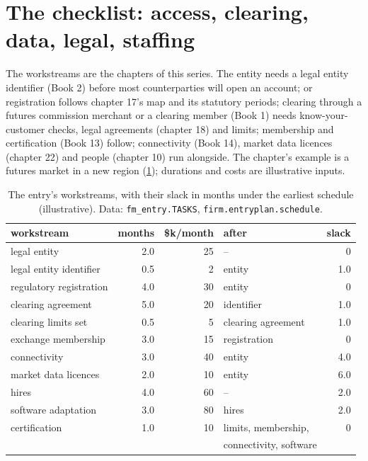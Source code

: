 \section{The checklist: access, clearing, data, legal, staffing}

The workstreams are the chapters of this series. The entity needs a legal entity identifier (Book 2) before most counterparties will open an
account;  or registration follows chapter 17's map and its statutory periods; clearing through a futures commission merchant or a
clearing member (Book 1) needs know-your-customer checks, legal agreements (chapter 18) and limits; membership and certification (Book 13) follow;
connectivity (Book 14), market data licences (chapter 22) and people (chapter 10) run alongside. The chapter's example is a futures market in a new
region (\cref{tab:fm:entering-a-new-market:tasks}); durations and costs are illustrative inputs.

\begin{table}[ht]
\centering\small
\begin{tabular}{lrrlr}
\toprule
workstream & months & \$k/month & after & slack \\
\midrule
legal entity & 2.0 & 25 & -- & 0 \\
legal entity identifier & 0.5 & 2 & entity & 1.0 \\
regulatory registration & 4.0 & 30 & entity & 0 \\
clearing agreement & 5.0 & 20 & identifier & 1.0 \\
clearing limits set & 0.5 & 5 & clearing agreement & 1.0 \\
exchange membership & 3.0 & 15 & registration & 0 \\
connectivity & 3.0 & 40 & entity & 4.0 \\
market data licences & 2.0 & 10 & entity & 6.0 \\
hires & 4.0 & 60 & -- & 2.0 \\
software adaptation & 3.0 & 80 & hires & 2.0 \\
certification & 1.0 & 10 & limits, membership, & 0 \\
 & & & connectivity, software & \\
\bottomrule
\end{tabular}
\caption{The entry's workstreams, with their slack in months under the earliest schedule (illustrative). Data: \texttt{fm\_entry.TASKS}, \texttt{firm.entryplan.schedule}.}\label{tab:fm:entering-a-new-market:tasks}
\end{table}

